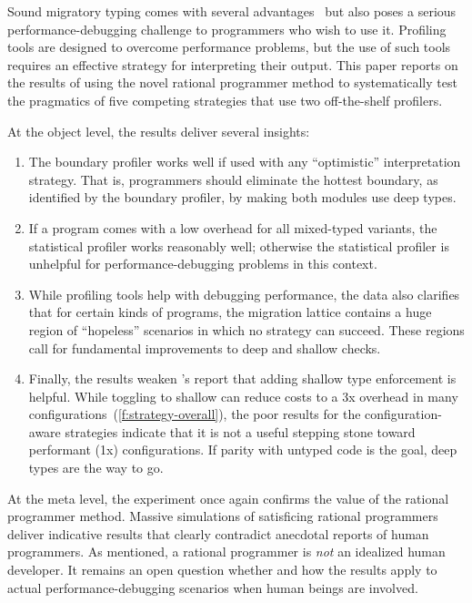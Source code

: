 

Sound migratory typing comes with several advantages~\cite{lgfd-icfp-2021,lgfd-icfp-2023} 
but also poses a serious performance-debugging challenge to
programmers who wish to use it.
Profiling tools are designed to overcome performance problems, but the
use of such tools requires an effective strategy for interpreting their output.
This paper reports
on the results of using the novel rational programmer  method to
systematically test the pragmatics of five competing strategies that use two
off-the-shelf profilers.

At the object level, the results deliver several insights:
\begin{enumerate}
  \item
    The boundary profiler works well if used with any ``optimistic''
    interpretation strategy. That is, programmers should eliminate the hottest
    boundary, as identified by the boundary profiler, by making both modules
    use deep types.

  \item
    If a program comes with a low overhead for all mixed-typed
    variants, the statistical profiler works reasonably well; otherwise the
    statistical profiler is unhelpful for performance-debugging problems in
    this context.

  \item
    While profiling tools help with debugging
    performance, the data also clarifies that for
    certain kinds of programs, the migration lattice contains a huge region
    of ``hopeless'' scenarios in which no strategy can succeed.
    These regions call for fundamental improvements to deep and shallow checks.

  \item
    Finally, the results weaken \citet{g-deep-shallow}'s report that
    adding shallow type enforcement is helpful.
    While toggling to shallow can reduce costs to a 3x overhead in many
    configurations~(\cref{f:strategy-overall}), the poor results for the
    configuration-aware strategies indicate that it is not a useful stepping
    stone toward performant (1x) configurations.
    If parity with untyped code is the goal, deep types are the way to go.
\end{enumerate}

At the meta level, the experiment once again confirms the value of the
rational programmer method. Massive simulations of satisficing rational
programmers deliver indicative results that clearly contradict anecdotal reports
of human programmers. As mentioned, a rational programmer is {\em not\/} an
idealized human developer. It remains an open question whether and how the
results apply to actual performance-debugging scenarios when human beings are
involved.

